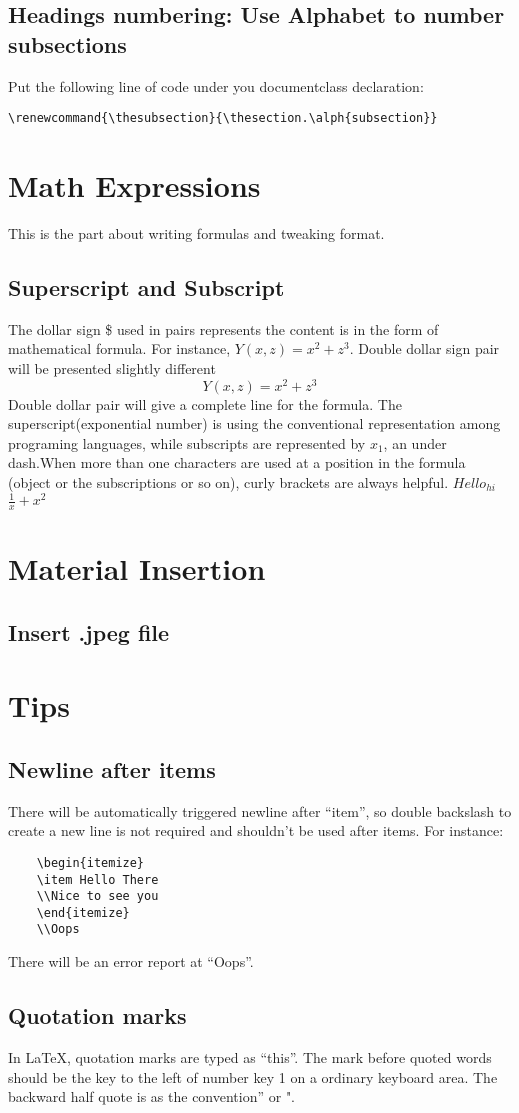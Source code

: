 \documentclass[12pt]{article}
\begin{document}
	\subsection{Headings numbering: Use Alphabet to number subsections}
	Put the following line of code under you documentclass declaration:
		\begin{lstlisting}	
\renewcommand{\thesubsection}{\thesection.\alph{subsection}}			
		\end{lstlisting}
	\section{Math Expressions}	
This is the part about writing formulas and tweaking format.
	\subsection{Superscript and Subscript}
The dollar sign \$ used in pairs represents the content is in the form of mathematical formula. For instance, $Y(x,z)=x^2+z^3$. Double dollar sign pair will be presented slightly different $$Y(x,z)=x^2+z^3$$ Double dollar pair will give a complete line for the formula. The superscript(exponential number) is using the conventional representation among programing languages, while subscripts are represented by $x_1$, an under dash.When more than one characters are used at a position in the formula (object or the subscriptions or so on), curly brackets are always helpful. ${Hello}_{hi}$
$ \frac{1}{x}+x^2$
\section{Material Insertion}
	\subsection{Insert .jpeg file}
\section{Tips}
	\subsection{Newline after items}
	There will be automatically triggered newline after ``item'', so double backslash to create a new line is not required and shouldn't be used after items. For instance:
	\begin{lstlisting}	
	\begin{itemize}
	\item Hello There
	\\Nice to see you
	\end{itemize}
	\\Oops
	\end{lstlisting}
	There will be an error report at ``Oops''.
	\subsection{Quotation marks}
	In \LaTeX, quotation marks are typed as ``this''. The mark before quoted words should be the key to the left of number key 1 on a ordinary keyboard area. The backward half quote is as the convention'' or ".

	
\end{document}
